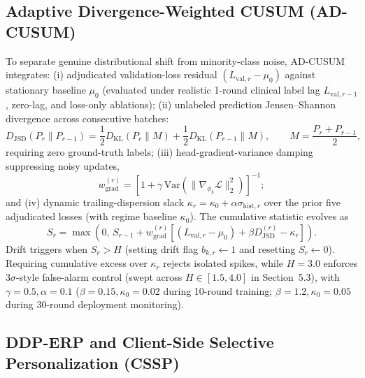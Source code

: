 \documentclass{llncs}
\begin{document}
\subsection{Adaptive Divergence-Weighted CUSUM (AD-CUSUM)}

To separate genuine distributional shift from minority-class noise, AD-CUSUM integrates: (i) adjudicated validation-loss residual $(L_{\mathrm{val},r}-\mu_0)$ against stationary baseline $\mu_0$ (evaluated under realistic 1-round clinical label lag $L_{\mathrm{val},r-1}$, zero-lag, and loss-only ablations); (ii) unlabeled prediction Jensen--Shannon divergence across consecutive batches:
\begin{equation}
D_{\mathrm{JSD}}(P_r\|P_{r-1})
=\frac{1}{2}D_{\mathrm{KL}}(P_r\|M)
+\frac{1}{2}D_{\mathrm{KL}}(P_{r-1}\|M),\qquad M=\frac{P_r+P_{r-1}}{2},
\end{equation}
requiring zero ground-truth labels; (iii) head-gradient-variance damping suppressing noisy updates,
\begin{equation}
w_{\mathrm{grad}}^{(r)}=\left[1+\gamma\,\mathrm{Var}\!\left(\|\nabla_{\phi_k}\mathcal{L}\|_2^2\right)\right]^{-1};
\end{equation}
and (iv) dynamic trailing-dispersion slack $\kappa_r = \kappa_0 + \alpha\sigma_{\mathrm{hist},r}$ over the prior five adjudicated losses (with regime baseline $\kappa_0$). The cumulative statistic evolves as
\begin{equation}\label{eq:ad_cusum}
S_r=\max\!\left(0,\,S_{r-1}+w_{\mathrm{grad}}^{(r)}\!\left[(L_{\mathrm{val},r}-\mu_0)+\beta D_{\mathrm{JSD}}^{(r)}-\kappa_r\right]\right).
\end{equation}
Drift triggers when $S_r>H$ (setting drift flag $b_{k,r}\leftarrow 1$ and resetting $S_r\leftarrow 0$). Requiring cumulative excess over $\kappa_r$ rejects isolated spikes, while $H=3.0$ enforces $3\sigma$-style false-alarm control (swept across $H\in[1.5,4.0]$ in Section~5.3), with $\gamma=0.5, \alpha=0.1$ ($\beta=0.15, \kappa_0=0.02$ during 10-round training; $\beta=1.2, \kappa_0=0.05$ during 30-round deployment monitoring).

\subsection{DDP-ERP and Client-Side Selective Personalization (CSSP)}
\end{document}

